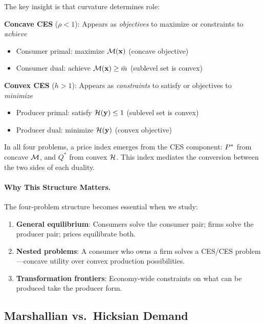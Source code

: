 \begin{calloutimportant}
The key insight is that curvature determines role:

\medskip
\textbf{Concave CES} ($\rho < 1$): Appears as \textit{objectives} to maximize or constraints to \textit{achieve}
\begin{itemize}[nosep, leftmargin=2em]
\item Consumer primal: maximize $\mathcal{M}(\mathbf{x})$ (concave objective)
\item Consumer dual: achieve $\mathcal{M}(\mathbf{x}) \geq \bar{m}$ (sublevel set is convex)
\end{itemize}

\medskip
\textbf{Convex CES} ($h > 1$): Appears as \textit{constraints} to satisfy or objectives to \textit{minimize}
\begin{itemize}[nosep, leftmargin=2em]
\item Producer primal: satisfy $\mathcal{H}(\mathbf{y}) \leq 1$ (sublevel set is convex)
\item Producer dual: minimize $\mathcal{H}(\mathbf{y})$ (convex objective)
\end{itemize}

\medskip
In all four problems, a price index emerges from the CES component: $P^{*}$ from concave $\mathcal{M}$, and $Q^*$ from convex $\mathcal{H}$. This index mediates the conversion between the two sides of each duality.
\end{calloutimportant}

\paragraph{Why This Structure Matters.}
The four-problem structure becomes essential when we study:
\begin{enumerate}[leftmargin=2em]
\item \textbf{General equilibrium}: Consumers solve the consumer pair; firms solve the producer pair; prices equilibrate both.
\item \textbf{Nested problems}: A consumer who owns a firm solves a CES/CES problem---concave utility over convex production possibilities.
\item \textbf{Transformation frontiers}: Economy-wide constraints on what can be produced take the producer form.
\end{enumerate}

\subsection{Marshallian vs.\ Hicksian Demand}
\label{subsec:marshallian-hicksian}

